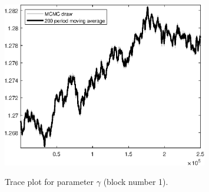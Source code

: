 \begin{figure}[H]
\centering
  \includegraphics[width=0.8\textwidth]{BRS_imp_mobility/graphs/TracePlot_gam_blck_1}\\
    \caption{Trace plot for parameter ${\gamma}$ (block number 1).}
\end{figure}
